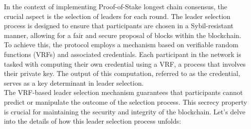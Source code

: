 In the context of implementing Proof-of-Stake longest chain consensus, the crucial aspect is the selection of leaders for each round. The leader selection process is designed to ensure that participants are chosen in a Sybil-resistant manner, allowing for a fair and secure proposal of blocks within the blockchain.\\
To achieve this, the protocol employs a mechanism based on verifiable random functions (VRFs) and associated credentials. Each participant in the network is tasked with computing their own credential using a VRF, a process that involves their private key. The output of this computation, referred to as the credential, serves as a key determinant in leader selection.\\
The VRF-based leader selection mechanism guarantees that participants cannot predict or manipulate the outcome of the selection process. This secrecy property is crucial for maintaining the security and integrity of the blockchain. Let's delve into the details of how this leader selection process unfolds:

